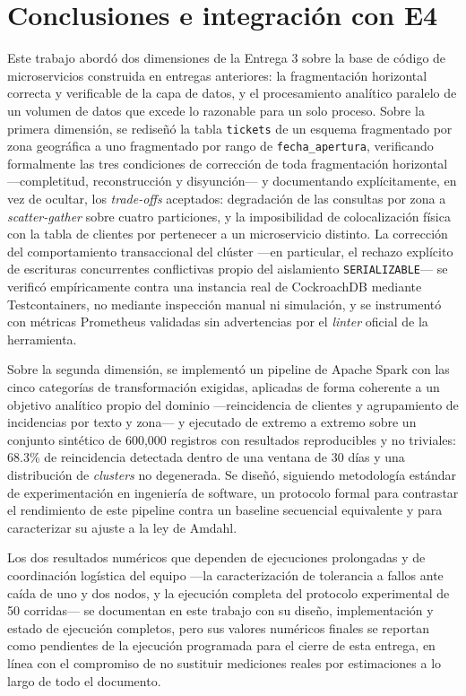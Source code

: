\documentclass[11pt,letterpaper]{article}
\begin{document}
\section{Conclusiones e integración con E4}
\label{sec:conclusiones}

Este trabajo abordó dos dimensiones de la Entrega 3 sobre la base de código de microservicios
construida en entregas anteriores: la fragmentación horizontal correcta y verificable de la capa
de datos, y el procesamiento analítico paralelo de un volumen de datos que excede lo razonable
para un solo proceso. Sobre la primera dimensión, se rediseñó la tabla \texttt{tickets} de un
esquema fragmentado por zona geográfica a uno fragmentado por rango de \texttt{fecha\_apertura},
verificando formalmente las tres condiciones de corrección de toda fragmentación horizontal
—completitud, reconstrucción y disyunción— y documentando explícitamente, en vez de ocultar, los
\emph{trade-offs} aceptados: degradación de las consultas por zona a \emph{scatter-gather} sobre
cuatro particiones, y la imposibilidad de colocalización física con la tabla de clientes por
pertenecer a un microservicio distinto. La corrección del comportamiento transaccional del clúster
—en particular, el rechazo explícito de escrituras concurrentes conflictivas propio del aislamiento
\texttt{SERIALIZABLE}— se verificó empíricamente contra una instancia real de CockroachDB mediante
Testcontainers, no mediante inspección manual ni simulación, y se instrumentó con métricas
Prometheus validadas sin advertencias por el \emph{linter} oficial de la herramienta.

Sobre la segunda dimensión, se implementó un pipeline de Apache Spark con las cinco categorías de
transformación exigidas, aplicadas de forma coherente a un objetivo analítico propio del dominio
—reincidencia de clientes y agrupamiento de incidencias por texto y zona— y ejecutado de extremo a
extremo sobre un conjunto sintético de 600{,}000 registros con resultados reproducibles y no
triviales: 68.3\% de reincidencia detectada dentro de una ventana de 30 días y una distribución de
\emph{clusters} no degenerada. Se diseñó, siguiendo metodología estándar de experimentación en
ingeniería de software, un protocolo formal para contrastar el rendimiento de este pipeline contra
un baseline secuencial equivalente y para caracterizar su ajuste a la ley de Amdahl.

Los dos resultados numéricos que dependen de ejecuciones prolongadas y de coordinación logística
del equipo —la caracterización de tolerancia a fallos ante caída de uno y dos nodos, y la ejecución
completa del protocolo experimental de 50 corridas— se documentan en este trabajo con su diseño,
implementación y estado de ejecución completos, pero sus valores numéricos finales se reportan como
pendientes de la ejecución programada para el cierre de esta entrega, en línea con el compromiso de
no sustituir mediciones reales por estimaciones a lo largo de todo el documento.
\end{document}

